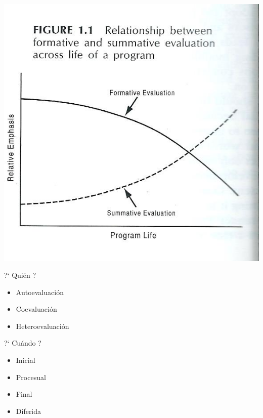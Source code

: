 \documentclass{beamer}
\begin{document}
\begin{frame}
\begin{center}
\includegraphics[scale=1]{importancia_relativa.jpg}
\end{center}
\end{frame}

\begin{frame}
\begin{block}{ ?` Qui\'en ?}
\begin{itemize}
\item Autoevaluaci\'on
\item Coevaluaci\'on
\item Heteroevaluaci\'on
\end{itemize}
\end{block}
\end{frame}


\begin{frame}
\begin{block}{ ?` Cu\'ando ?}
\begin{itemize}
\item Inicial
\item Procesual
\item Final
\item Diferida
\end{itemize}
\end{block}
\end{frame}
\end{document}
